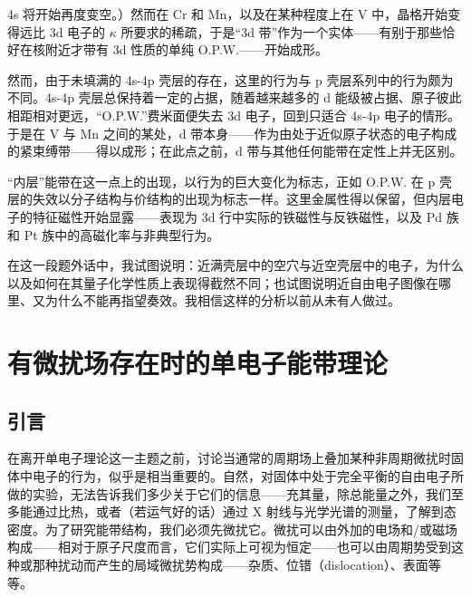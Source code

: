 


4s 将开始再度变空。）然而在 Cr 和 Mn，以及在某种程度上在 V 中，晶格开始变得远比 3d 电子的 $\kappa$ 所要求的稀疏，于是“3d 带”作为一个实体——有别于那些恰好在核附近才带有 3d 性质的单纯 O.P.W.——开始成形。

然而，由于未填满的 4s-4p 壳层的存在，这里的行为与 p 壳层系列中的行为颇为不同。4s-4p 壳层总保持着一定的占据，随着越来越多的 d 能级被占据、原子彼此相距相对更远，“O.P.W.”费米面便失去 3d 电子，回到只适合 4s-4p 电子的情形。于是在 V 与 Mn 之间的某处，d 带本身——作为由处于近似原子状态的电子构成的紧束缚带——得以成形；在此点之前，d 带与其他任何能带在定性上并无区别。

“内层”能带在这一点上的出现，以行为的巨大变化为标志，正如 O.P.W. 在 p 壳层的失效以分子结构与价结构的出现为标志一样。这里金属性得以保留，但内层电子的特征磁性开始显露——表现为 3d 行中实际的铁磁性与反铁磁性，以及 Pd 族和 Pt 族中的高磁化率与非典型行为。

在这一段题外话中，我试图说明：近满壳层中的空穴与近空壳层中的电子，为什么以及如何在其量子化学性质上表现得截然不同；也试图说明近自由电子图像在哪里、又为什么不能再指望奏效。我相信这样的分析以前从未有人做过。

\section{有微扰场存在时的单电子能带理论}

\subsection{引言}

在离开单电子理论这一主题之前，讨论当通常的周期场上叠加某种非周期微扰时固体中电子的行为，似乎是相当重要的。自然，对固体中处于完全平衡的自由电子所做的实验，无法告诉我们多少关于它们的信息——充其量，除总能量之外，我们至多能通过比热，或者（若运气好的话）通过 X 射线与光学光谱的测量，了解到态密度。为了研究能带结构，我们必须先微扰它。微扰可以由外加的电场和/或磁场构成——相对于原子尺度而言，它们实际上可视为恒定——也可以由周期势受到这种或那种扰动而产生的局域微扰势构成——杂质、位错（dislocation）、表面等等。

